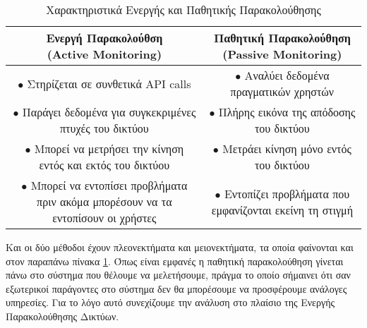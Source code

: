 \begin{table}[H]
	\begin{center}
		\caption{Χαρακτηριστικά Ενεργής και Παθητικής Παρακολούθησης}
		\label{tab:active_vs_passive_monitoring}
		\begin{tabular}{ | c | c | }
			\hline
				\thead{Ενεργή Παρακολούθση \\ (Active Monitoring)} & \thead{Παθητική Παρακολούθηση \\ (Passive Monitoring)} \\
			\hline
				\makecell{$\bullet$ Στηρίζεται σε συνθετικά \\ API calls} & \makecell{$\bullet$ Αναλύει δεδομένα πραγματικών \\ χρηστών} \\
				\makecell{$\bullet$ Παράγει δεδομένα για συγκεκριμένες \\ πτυχές του δικτύου} & \makecell{$\bullet$ Πλήρης εικόνα της απόδοσης \\ του δικτύου} \\
				\makecell{$\bullet$ Μπορεί να μετρήσει την κίνηση \\ εντός και εκτός του δικτύου} & \makecell{$\bullet$ Μετράει κίνηση μόνο \\ εντός του δικτύου} \\
				\makecell{$\bullet$ Μπορεί να εντοπίσει προβλήματα \\ πριν ακόμα μπορέσουν να τα \\ εντοπίσουν οι χρήστες} & \makecell{$\bullet$ Εντοπίζει προβλήματα που \\ εμφανίζονται εκείνη τη στιγμή} \\
			\hline
		\end{tabular}
	\end{center}
\end{table}

Και οι δύο μέθοδοι έχουν πλεονεκτήματα και μειονεκτήματα, τα οποία φαίνονται και στον παραπάνω πίνακα \ref{tab:active_vs_passive_monitoring}. Όπως είναι εμφανές
η παθητική παρακολούθηση γίνεται πάνω στο σύστημα που θέλουμε να μελετήσουμε, πράγμα το οποίο σήμαινει ότι σαν εξωτερικοί παράγοντες στο
σύστημα δεν θα μπορέσουμε να προσφέρουμε ανάλογες υπηρεσίες. Για το λόγο αυτό συνεχίζουμε την ανάλυση στο πλαίσιο της Ενεργής Παρακολούθησης Δικτύων.

